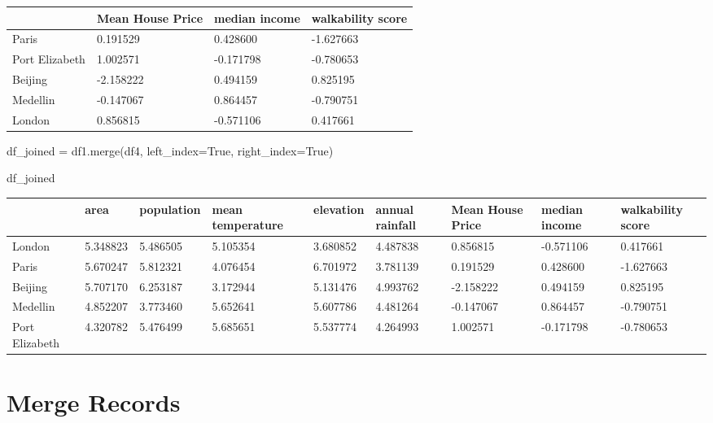\documentclass[
  letterpaper,
  DIV=11,
  numbers=noendperiod]{scrreprt}
\newenvironment{Shaded}{\begin{snugshade}}{\end{snugshade}}
\newcommand{\NormalTok}[1]{\textcolor[rgb]{0.00,0.23,0.31}{#1}}
\newcommand{\OperatorTok}[1]{\textcolor[rgb]{0.37,0.37,0.37}{#1}}
\newcommand{\VariableTok}[1]{\textcolor[rgb]{0.07,0.07,0.07}{#1}}
\begin{document}
\begin{longtable}[]{@{}llll@{}}
\toprule()
& Mean House Price & median income & walkability score \\
\midrule()
\endhead
Paris & 0.191529 & 0.428600 & -1.627663 \\
Port Elizabeth & 1.002571 & -0.171798 & -0.780653 \\
Beijing & -2.158222 & 0.494159 & 0.825195 \\
Medellin & -0.147067 & 0.864457 & -0.790751 \\
London & 0.856815 & -0.571106 & 0.417661 \\
\bottomrule()
\end{longtable}

\begin{Shaded}
\begin{Highlighting}[]
\NormalTok{df\_joined }\OperatorTok{=}\NormalTok{ df1.merge(df4, left\_index}\OperatorTok{=}\VariableTok{True}\NormalTok{, right\_index}\OperatorTok{=}\VariableTok{True}\NormalTok{)}
\end{Highlighting}
\end{Shaded}

\begin{Shaded}
\begin{Highlighting}[]
\NormalTok{df\_joined}
\end{Highlighting}
\end{Shaded}

\begin{longtable}[]{@{}lllllllll@{}}
\toprule()
& area & population & mean temperature & elevation & annual rainfall &
Mean House Price & median income & walkability score \\
\midrule()
\endhead
London & 5.348823 & 5.486505 & 5.105354 & 3.680852 & 4.487838 & 0.856815
& -0.571106 & 0.417661 \\
Paris & 5.670247 & 5.812321 & 4.076454 & 6.701972 & 3.781139 & 0.191529
& 0.428600 & -1.627663 \\
Beijing & 5.707170 & 6.253187 & 3.172944 & 5.131476 & 4.993762 &
-2.158222 & 0.494159 & 0.825195 \\
Medellin & 4.852207 & 3.773460 & 5.652641 & 5.607786 & 4.481264 &
-0.147067 & 0.864457 & -0.790751 \\
Port Elizabeth & 4.320782 & 5.476499 & 5.685651 & 5.537774 & 4.264993 &
1.002571 & -0.171798 & -0.780653 \\
\bottomrule()
\end{longtable}

\hypertarget{merge-records}{%
\section{Merge Records}\label{merge-records}}
\end{document}

